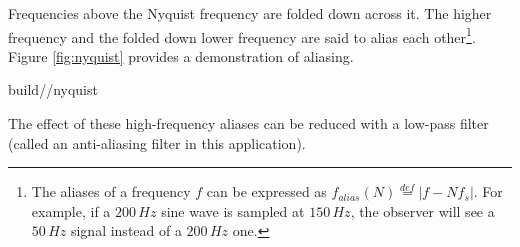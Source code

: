 Frequencies above the Nyquist frequency are folded down across it. The higher
frequency and the folded down lower frequency are said to alias each
other\footnote{The aliases of a frequency $f$ can be expressed as
$f_{alias}(N) \stackrel{def}{=} |f - Nf_s|$. For example, if a $200\,Hz$ sine
wave is sampled at $150\,Hz$, the \gls{observer} will see a $50\,Hz$ signal
instead of a $200\,Hz$ one.}. Figure \ref{fig:nyquist} provides a demonstration
of aliasing.

\begin{svg}{build/\chapterpath/nyquist}
  \caption{The samples of two sine waves can be identical when at least one of
    them is at a frequency above half the sample rate. In this case, the $2\,Hz$
    sine wave is above the Nyquist frequency $1.5\,Hz$.}
  \label{fig:nyquist}
\end{svg}

The effect of these high-frequency aliases can be reduced with a low-pass filter
(called an anti-aliasing filter in this application).
